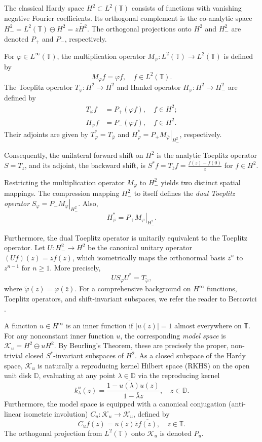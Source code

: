 \documentclass[12pt]{amsart}
\theoremstyle{definition}
\theoremstyle{remark}
\def \D{\mathbb{D}}
\def \T{\mathbb{T}}
\newcommand{\clk}{\mathcal{K}}
\newcommand{\vp}{\varphi}
\newcommand{\ol}{\overline}
\newcommand\restr[2]{\ensuremath{\left.#1\right|_{#2}}}
\numberwithin{equation}{section}
\begin{document}
The classical Hardy space $H^2 \subset L^2(\T)$ consists of functions with vanishing negative Fourier coefficients. Its orthogonal complement is the co-analytic space $H_{-}^2 = L^2(\T) \ominus H^2 = \ol{z H^2}$. The orthogonal projections onto $H^2$ and $H_{-}^2$ are denoted $P_{+}$ and $P_{-}$, respectively. 

For $\vp \in L^\infty(\T)$, the multiplication operator $M_\vp : L^2(\T) \to L^2(\T)$ is defined by 
\[M_\vp f = \vp f, \quad f\in L^2(\T). \]
The Toeplitz operator $T_\vp : H^2 \to H^2$ and Hankel operator $H_\vp : H^2 \to H_{-}^2$ are defined by 
\begin{align}
    T_\vp f &= P_{+}(\vp f),\quad f\in H^2; \\
    H_\vp f &= P_{-}(\vp f),\quad f\in H^2.
\end{align}
Their adjoints are given by $T_\vp^* = T_{\bar{\vp}}$ and $H_\vp^* = \restr{P_{+} M_{\bar{\vp}}}{H_{-}^2}$, respectively. 

Consequently, the unilateral forward shift on $H^2$ is the analytic Toeplitz operator $S = T_z$, and its adjoint, the backward shift, is $S^* f = T_{\bar{z}} f = \frac{f(z) - f(0)}{z}$ for $f\in H^2$.

Restricting the multiplication operator $M_\vp$ to $H_{-}^2$ yields two distinct spatial mappings. The compression mapping $H_{-}^2$ to itself defines the \emph{dual Toeplitz operator} $S_\vp = P_{-} \restr{M_\vp}{H_{-}^2}$. Also,
\begin{equation}
    H_{\bar{\vp}}^* = P_{+} \restr{M_\vp}{H_{-}^2}.
\end{equation}

Furthermore, the dual Toeplitz operator is unitarily equivalent to the Toeplitz operator. Let $U : H_{-}^2 \to H^2$ be the canonical unitary operator $(Uf)(z) = \bar{z}f(\bar{z})$, which isometrically maps the orthonormal basis $\bar{z}^n$ to $z^{n-1}$ for $n \ge 1$. More precisely,
\begin{equation}
    U S_\vp U^* = T_{\tilde{\vp}},
\end{equation}
where $\tilde{\vp}(z) = \vp(\bar{z})$. For a comprehensive background on $H^\infty$ functions, Toeplitz operators, and shift-invariant subspaces, we refer the reader to Bercovici \cite{Bercovici}.

A function $u \in H^\infty$ is an inner function if $|u(z)| = 1$ almost everywhere on $\T$. For any nonconstant inner function $u$, the corresponding \emph{model space} is $\clk_u = H^2 \ominus uH^2$. By Beurling's Theorem, these are precisely the proper, non-trivial closed $S^*$-invariant subspaces of $H^2$. As a closed subspace of the Hardy space, $\clk_u$ is naturally a reproducing kernel Hilbert space (RKHS) on the open unit disk $\D$, evaluating at any point $\lambda \in \D$ via the reproducing kernel
\[ k_\lambda^u(z) = \frac{1-\ol{u(\lambda)}u(z)}{1-\bar{\lambda}z},\quad z\in \D. \]
Furthermore, the model space is equipped with a canonical conjugation (anti-linear isometric involution) $C_u : \clk_u \to \clk_u$, defined by
\begin{equation}\label{eq:conjuModelspace}
    C_u f(z) = u(z)\bar{z}\ol{f(z)}, \quad z\in \T.
\end{equation}
The orthogonal projection from $L^2(\T)$ onto $\clk_u$ is denoted $P_u$.
\end{document}
